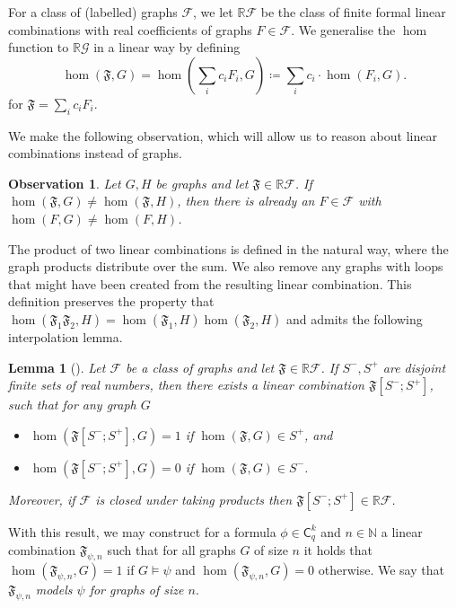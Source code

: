 \documentclass[10pt,a4paper]{article}
\newtheorem{lemma}[theorem]{Lemma}
\newcommand{\R}{\ensuremath{\mathbb{R}}}
\newcommand{\N}{\ensuremath{\mathbb{N}}}
\newcommand{\CG}{\ensuremath{\mathcal G}}
\newcommand{\lC} {\ensuremath{\mathsf C}}
\newcommand{\qg}[1]{\ensuremath{\mathfrak{#1}}} \newcommand{\qgp}[3]{\ensuremath{\mathfrak{#1}[#3; #2]}}
\newtheorem{observation}[theorem]{Observation}
\begin{document}
For a class of (labelled) graphs $\mathcal{F}$, we let $\R\mathcal{F}$ be the class of finite formal linear combinations with real coefficients of graphs $F \in \mathcal{F}$. We generalise the $\hom$ function to $\R\CG$ in a linear way by defining
\begin{equation*}
    \hom(\qg{F}, G) = \hom(\sum_i c_iF_i, G) \coloneqq \sum_i c_i \cdot \hom(F_i, G).
  \end{equation*}
for $\qg{F} = \sum_i c_iF_i$.

  We make the following observation, which will allow us to reason about linear combinations instead of graphs.

  \begin{observation}\label{prp:qgdistinguishing}
    Let $G, H$ be graphs and let $\qg{F} \in \R\mathcal{F}$. If $\hom(\qg{F}, G) \neq \hom(\qg{F}, H)$, then there is already an $F \in \mathcal{F}$ with $\hom(F, G) \neq \hom(F, H)$.
  \end{observation}

  The product of two linear combinations is defined in the natural way, where the graph products distribute over the sum. We also remove any graphs with loops that might have been created from the resulting linear combination. This definition preserves the property that $\hom(\qg{F}_1\qg{F}_2, H) = \hom(\qg{F}_1, H)\hom(\qg{F}_2, H)$ and admits the following interpolation lemma.

  \begin{lemma}[{\cite[Lemma 5]{dvorak_recognizing_2010}}]
    \label{lem:qginterpolation}
  Let $\mathcal{F}$ be a class of graphs and let $\qg{F} \in \R\mathcal{F}$. If $S^-, S^+$ are disjoint finite sets of real numbers, then there exists a linear combination $\qgp{F}{S^+}{S^-}$, such that for any graph $G$
  \begin{itemize}
    \item $\hom(\qgp{F}{S^+}{S^-}, G) = 1$ if $\hom(\qg{F}, G) \in S^+$, and
    \item $\hom(\qgp{F}{S^+}{S^-}, G) = 0$ if $\hom(\qg{F}, G) \in S^-$.
  \end{itemize}
    Moreover, if $\mathcal{F}$ is closed under taking products then $\qgp{F}{S^+}{S^-} \in \R\mathcal{F}$.
  \end{lemma}

  With this result, we may construct for a formula $\phi \in \lC^k_q$ and $n \in \N$ a linear combination $\qg{F}_{\psi, n}$ such that for all graphs $G$ of size $n$ it holds that $\hom(\qg{F}_{\psi, n}, G) = 1$ if $G \models \psi$ and $\hom(\qg{F}_{\psi, n}, G) = 0$ otherwise. We say that $\qg{F}_{\psi, n}$ \emph{models $\psi$ for graphs of size $n$}.
\end{document}
